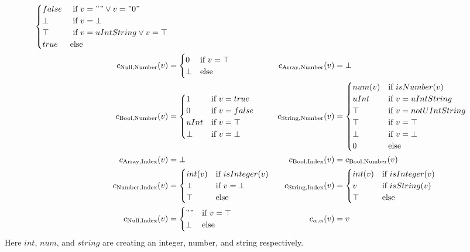 {\begin{align*}
\begin{cases}
       false & \text{ if $v = "" \vee v = "0"$} \\
       \bot & \text{ if $v = \bot$}\\
       \top & \text{ if $v = uIntString \vee v = \top$}\\
       true & \text{else}
  \end{cases}\\
c_{\text{Null}, \text{Number}}(v) &= \begin{cases} 
       0 & \text{if $v = \top$}\\
       \bot & \text{else}
  \end{cases} &
  c_{\text{Array}, \text{Number}}(v) &= \bot \\
c_{\text{Bool}, \text{Number}}(v) &=\begin{cases} 
       1 & \text{if $v = true$}\\
       0 & \text{if $v = false$}\\
       uInt & \text{if $v = \top$}\\
       \bot & \text{if $v = \bot$}
  \end{cases} &
c_{\text{String}, \text{Number}}(v) &=\begin{cases} 
       num(v) & \text{if $isNumber(v)$}\\
       uInt & \text{if $v = uIntString$ }\\
       \top & \text{if $v = notUIntString$  }\\
       \top & \text{if $v = \top$}\\
       \bot & \text{if $v = \bot$}\\
       0 & \text{else}
  \end{cases}\\
  c_{\text{Array}, \text{Index}}(v) &= \bot &
c_{\text{Bool}, \text{Index}}(v) &= c_{\text{Bool}, \text{Number}}(v)\\
c_{\text{Number}, \text{Index}}(v) &= \begin{cases} 
        int(v) & \text{if $isInteger(v)$}\\
        \bot & \text{if $v = \bot $}\\
        \top & \text{else} 
  \end{cases} &
c_{\text{String}, \text{Index}}(v) &= \begin{cases} 
       int(v) & \text{if $isInteger(v)$}\\
       v & \text{if $isString(v)$}\\
       \top & \text{else}
\end{cases}\\
c_{\text{Null}, \text{Index}}(v) &= \begin{cases} 
       "" & \text{if $v = \top$}\\
       \bot & \text{else}
      \end{cases} &
c_{\alpha, \alpha} (v) &= v
\end{align*}
}
Here $int$, $num$, and $string$ are creating an integer, number, and string respectively.

